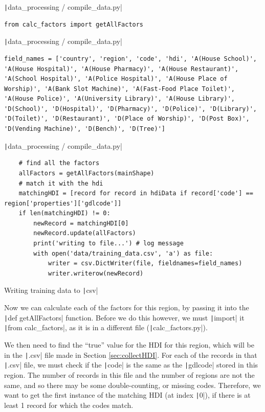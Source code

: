 \documentclass[12pt]{report}
\newcommand{\pil}[1]{\protect\texttt|#1|}
\begin{document}
\begin{listing}[H]
\pil{data_processing / compile_data.py}
\begin{verbatim}
from calc_factors import getAllFactors
\end{verbatim}
\pil{data_processing / compile_data.py}
\begin{verbatim}
field_names = ['country', 'region', 'code', 'hdi', 'A(House School)', 'A(House Hospital)', 'A(House Pharmacy)', 'A(House Restaurant)', 'A(School Hospital)', 'A(Police Hospital)', 'A(House Place of Worship)', 'A(Bank Slot Machine)', 'A(Fast-Food Place Toilet)', 'A(House Police)', 'A(University Library)', 'A(House Library)', 'D(School)', 'D(Hospital)', 'D(Pharmacy)', 'D(Police)', 'D(Library)', 'D(Toilet)', 'D(Restaurant)', 'D(Place of Worship)', 'D(Post Box)', 'D(Vending Machine)', 'D(Bench)', 'D(Tree)']
\end{verbatim}
\pil{data_processing / compile_data.py}
\begin{verbatim}
    # find all the factors
    allFactors = getAllFactors(mainShape)
    # match it with the hdi
    matchingHDI = [record for record in hdiData if record['code'] == region['properties']['gdlcode']]
    if len(matchingHDI) != 0:
        newRecord = matchingHDI[0]
        newRecord.update(allFactors)
        print('writing to file...') # log message
        with open('data/training_data.csv', 'a') as file:
            writer = csv.DictWriter(file, fieldnames=field_names)
            writer.writerow(newRecord)
\end{verbatim}
\caption{Writing training data to \pil{csv}}\label{cs:writeTrainingData}
\end{listing}

Now we can calculate each of the factors for this region, by passing it into the \pil{def getAllFactors} function. Before we do this however, we must \pil{import} it \pil{from calc_factors}, as it is in a different file (\pil{calc_factors.py}).

We then need to find the ``true'' value for the HDI for this region, which will be in the \pil{.csv} file made in Section \ref{sec:collectHDI}. For each of the records in that \pil{.csv} file, we must check if the \pil{code} is the same as the \pil{gdlcode} stored in this region. The number of records in this file and the number of regions are not the same, and so there may be some double-counting, or missing codes. Therefore, we want to get the first instance of the matching HDI (at index \pil{0}), if there is at least 1 record for which the codes match.
\end{document}
